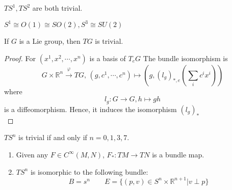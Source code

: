 \begin{example}
    $ TS^1,TS^2 $ are both trivial.
    
     $ S^1\cong O(1)\cong SO(2),S^3\cong SU(2) $ 
\end{example}
\begin{theorem}
   If  $ G  $ is a Lie group, then  $ TG  $ is trivial.
\end{theorem}
\begin{proof}
    For $(x^1,x^2,\cdots,x^n)$ is a basis of $T_eG$
    The bundle isomorphism is 
    \[G\times \mathbb{R}^n\xrightarrow{\varphi}TG,\, (g,c^1,\cdots,c^n)\mapsto (g,(l_g)_{*,e}(\sum_ic^ix^i))\] 
    where 
    \[l_g:G\rightarrow G, h\mapsto gh\]
    is a diffeomorphism. Hence, it induces the isomorphism $(l_g)_*$\\
\end{proof}
\begin{proposition}[Adams, 1960s]
    $ TS^n  $ is trivial if and only if  $ n=0,1,3,7 $. 
\end{proposition}
\begin{proposition}
   \begin{enumerate}
       \item Given any  $ F\in C^\infty(M,N) $,  $ F_*:TM\rightarrow TN $ is a bundle map.
       \item  $ TS^n $ is isomorphic to the following bundle:
        \[B=s^n\qquad E=\{(p,v)\in S^n\times \mathbb{R}^{n+1}|v\perp p\}\]   
   \end{enumerate}
\end{proposition}
